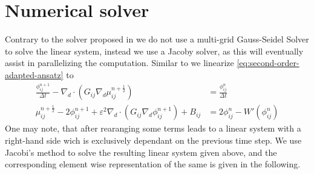 \documentclass{mimosis}
\begin{document}
\chapter{Numerical solver}
\label{sec:orgcc117a2}
Contrary to the solver proposed in \autocite{Ulmer_CHRelaxed_2024} we do not use a multi-grid Gauss-Seidel Solver to solve the linear system, instead we use a Jacoby solver, as this will eventually assist in parallelizing the computation.
Similar to \autocite{Ulmer_CHRelaxed_2024} we linearize \eqref{eq:second-order-adapted-ansatz} to
\begin{equation}
\begin{aligned}
\frac{\phi_{ij}^{n+1}}{\Delta t}  -  \nabla _d \cdot (G_{ij} \nabla_d \mu_{ij}^{n+\frac{1}{2}} ) &= \frac{ \phi_{ij}^n}{\Delta t}  \\
 \mu_{ij}^{n+\frac{1}{2}} - 2\phi_{ij}^{n+1} + \varepsilon^2  \nabla_d \cdot  (G_{ij} \nabla _d \phi_{ij}^{n+1} ) + B_{ij} &=2\phi _{ij}^n - W'(\phi_{ij}^n)
\end{aligned}
\end{equation}
One may note, that after rearanging some terms leads to a linear system with a right-hand side wich is exclusively dependant on the previous time step.
We use Jacobi's method to solve the resulting linear system given above, and the corresponding element wise representation of the same is given in the following.
\end{document}
